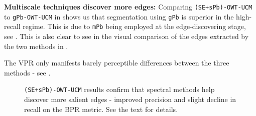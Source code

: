 \textbf{Multiscale techniques %
discover more edges:} Comparing {\tt (SE+sPb)-OWT-UCM} to {\tt gPb-OWT-UCM} in  shows us that segmentation using {\tt gPb} is superior in the high-recall regime. This is due to {\tt mPb} being employed at the edge-discovering stage, see . This is also clear to see in the visual comparison of the edges extracted by the two methods in .

The VPR only manifests barely perceptible differences %
between the three methods 
- see .

\begin{figure}[ht!]
\centering
\caption[{\tt (SE+sPb)-OWT-UCM} plots]{{\tt (SE+sPb)-OWT-UCM} results confirm that spectral methods help %
discover more salient edges - improved precision and slight decline in recall on the BPR metric. See the text for details.}
\label{fig:SE_nnms_sPb-UCM}
\end{figure}

